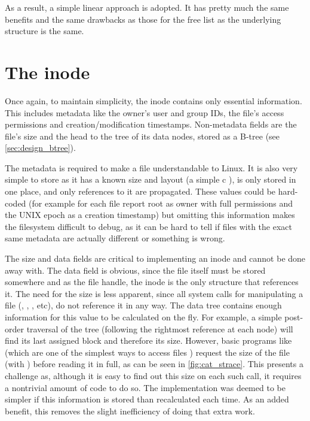         As a result, a simple linear approach is adopted. It has pretty much
        the same benefits and the same drawbacks as those for the free list as
        the underlying structure is the same.

    \section{The inode}

        Once again, to maintain simplicity, the inode contains only essential
        information. This includes metadata like the owner's user and group
        IDs, the file's access permissions and creation/modification timestamps.
        Non-metadata fields are the file's size and the head to the tree of
        its data nodes, stored as a B-tree (see \autoref{sec:design_btree}).

        The metadata is required to make a file understandable to Linux. It is
        also very simple to store as it has a known size and layout (a simple c
        ), is only stored in one place, and only references
        to it are propagated. These values could be hard-coded (for example for
        each file report root as owner with full permissions and the UNIX epoch
        as a creation timestamp) but omitting this information makes the
        filesystem difficult to debug, as it can be hard to tell if files with
        the exact same metadata are actually different or something is wrong.

        The size and data fields are critical to implementing an inode and
        cannot be done away with. The data field is obvious, since the file itself
        must be stored somewhere and as the file handle, the inode is the only
        structure that references it. The need for the size is less apparent,
        since all system calls for manipulating a file (,
        , ,  etc), do not reference
        it in any way. The data tree contains enough information for this value
        to be calculated on the fly. For example, a simple post-order
        traversal of the tree (following the rightmost reference at each node)
        will find its last assigned block and therefore its size. However, basic
        programs like  (which are one of the simplest ways to
        access files \cite{TLDP_proc_access}) request the size of the file
        (with ) before reading it in full, as can be seen in
        \autoref{fig:cat_strace}. This presents a challenge as, although it is
        easy to find out this size on each such call, it requires a
        nontrivial amount of code to do so. The implementation was deemed to be simpler if
        this information is stored than recalculated each time. As an added
        benefit, this removes the slight inefficiency of doing that extra work.

